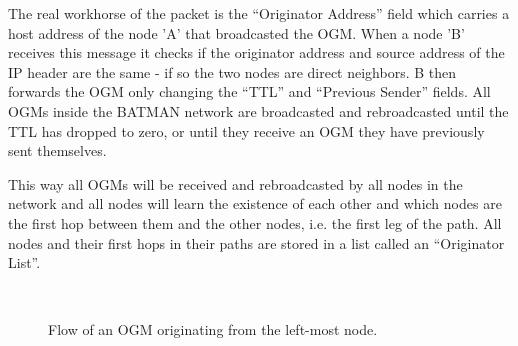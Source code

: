 The real workhorse of the packet is the ``Originator Address'' field which
carries a host address of the node 'A' that broadcasted the \ac{OGM}. When a
node 'B' receives this message it checks if the originator address and source
address of the IP header are the same - if so the two nodes are direct
neighbors. B then forwards the \ac{OGM} only changing the ``\ac{TTL}'' and
``Previous Sender'' fields. All \acp{OGM} inside the BATMAN network are
broadcasted and rebroadcasted until the TTL has dropped to zero, or until they
receive an \ac{OGM} they have previously sent themselves.

This way all \acp{OGM} will be received and rebroadcasted by all nodes in the
network and all nodes will learn the existence of each other and which nodes are
the first hop between them and the other nodes, i.e. the first leg of the path.
All nodes and their first hops in their paths are stored in a list called an
``Originator List''.

\begin{figure}[h]
	\centering
	\\
	\caption{Flow of an \acf{OGM} originating from the left-most node.}
	\label{fig:ogm_packet_flow}
\end{figure}

